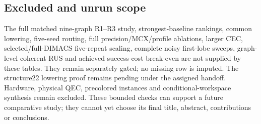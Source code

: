 \subsection{Excluded and unrun scope}
The full matched nine-graph R1--R3 study, strongest-baseline rankings, common
lowering, five-seed routing, full precision/MCX/profile ablations, larger CEC,
selected/full-DIMACS five-repeat scaling, complete noisy first-lobe sweeps,
graph-level coherent RUS and achieved success-cost break-even are not supplied
by these tables. They remain separately gated; no missing row is imputed.
The structure22 lowering proof remains pending under the assigned handoff.
Hardware, physical QEC, precolored instances and conditional-workspace synthesis
remain excluded. These bounded checks can support a future comparative study;
they cannot yet choose its final title, abstract, contributions or conclusions.
\endgroup
